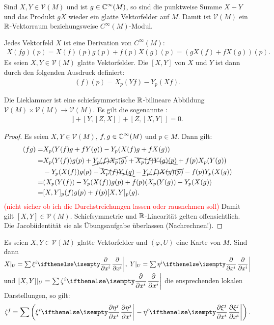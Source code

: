 \begin{bem*}
  Sind $X,Y \in \mathcal V(M)$ und ist $g \in \operatorname{\mathbb{C}}^{\infty}(M)$, so sind die punktweise Summe $X+Y$ und das Produkt $gX$ wieder ein glatte Vektorfelder auf $M$. Damit ist $\mathcal V(M)$ ein $\operatorname{\mathbb{R}}$-Vektorraum beziehungsweise $C^{\infty}(M)$-Modul.
  
  Jedes Vektorfeld $X$ ist eine Derivation von $C^{\infty}(M)$:
  \begin{align*}
    X(fg)(p) = X(f)(p)g(p) + f(p) X(g)(p) = \left(gX(f) + fX(g)\right)(p).
  \end{align*}
  Es seien $X,Y \in \mathcal V(M)$ glatte Vektorfelder. Die  $[X,Y]$ von $X$ und $Y$ ist dann durch den folgenden Ausdruck definiert:
  \begin{align*}
    [X,Y](f)(p) = X_p(Yf)-Y_p(Xf).
  \end{align*}
\end{bem*}

\begin{lemma}
  Die Lieklammer ist eine schiefsymmetrische $\operatorname{\mathbb{R}}$-bilineare Abbildung $\mathcal V(M) \times \mathcal V(M) \to \mathcal V(M)$. Es gilt die sogenannte :
  \begin{align*}
    [X,[Y,Z]] + [Y,[Z,X]] + [Z,[X,Y]] = 0.
  \end{align*}
\end{lemma}

\begin{proof}
  Es seien $X,Y \in \mathcal V(M)$, $f,g \in \operatorname{\mathbb{C}}^{\infty}(M)$ und $p \in M$. Dann gilt:
  \begin{align*}
    [X,Y](fg)  = & X_p(Y(f)g + fY(g)) - Y_p(X(f)g+fX(g))\\
    = & X_p(Y(f))g(p) + \cancel{Y_p(f)X_p(g)} + \bcancel{X_p(f)Y(g)(p)} + f(p)X_p(Y(g))\\
    & - Y_p(X(f))g(p) - \bcancel{X_p(f)Y_p(g)} - \cancel{Y_p(f)X(g)(p)} - f(p)Y_p(X(g))\\
    = & (X_p(Y(f))-Y_p(X(f))g(p) + f(p)(X_p(Y(g))-Y_p(X(g))\\
    = & [X,Y]_p (f)g(p) + f(p)[X,Y]_p(g).
  \end{align*}
  \textcolor{red}{(nicht sicher ob ich die Durchstreichungen lassen oder rausnehmen soll)}
  Damit gilt $[X,Y] \in \mathcal V(M)$. Schiefsymmetrie und $\operatorname{\mathbb{R}}$-Linearität gelten offensichtlich. Die Jacobiidentität sie als Übungsaufgabe überlassen (Nachrechnen!).
\end{proof}


\begin{lemma}
  Es seien $X,Y \in \mathcal V(M)$ glatte Vektorfelder und $(\varphi,U)$ eine Karte von $M$.
  Sind dann $X|_U = \sum \xi^i\pdifffrac{}{x^i}, \ Y|_U = \sum \eta^i \pdifffrac{}{x^i}$ und $[X,Y]|_U = \sum \zeta^i \pdifffrac{}{x^i}$ die ensprechenden lokalen Darstellungen, so gilt:
  \begin{align*}
    \zeta^j = \sum \left(\xi^i\pdifffrac{\eta^j}{x^i} - \eta^i \pdifffrac{\xi^j}{x^i} \right).
  \end{align*}
\end{lemma} 

